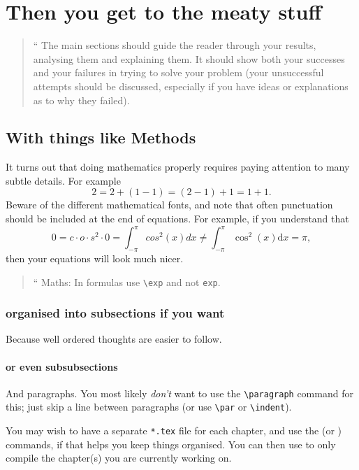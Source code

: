 \documentclass[11pt,a4,twosided,singlespacing,titlepagenumber=on]{scrreprt}
\numberwithin{equation}{chapter} %
\theoremstyle{remark}
\newenvironment{myquote}%
{\begin{quote}{\Large{}``}}%
{\ifhmode\unskip\fi{\Large{}''}\end{quote}}
\begin{document}
\chapter{Then you get to the meaty stuff}
\begin{myquote}
The main sections should guide the reader through your results, analysing them and explaining them.
It should show both your successes and your failures in trying to solve your problem (your unsuccessful
attempts should be discussed, especially if you have ideas or explanations as to why they failed).
\end{myquote}
\section{With things like Methods}
It turns out that doing mathematics properly requires paying attention to many subtle details. For example
\begin{equation}
2=2+(1-1)=(2-1)+1=1+1.
\label{eq:obvious}
\end{equation}
Beware of the different mathematical fonts, and note that often punctuation should be included at the end of equations. For example, if you understand that 
\begin{equation*}
0=c\cdot o \cdot s^2 \cdot 0=\int_{-\pi}^\pi cos^2(x) dx \neq \int_{-\pi}^\pi \cos^2(x) \mathrm{d}x=\pi,
\end{equation*}
then your equations will look much nicer.
\begin{myquote}
Maths: In formulas use \verb|\exp| and not \verb|exp|.
\end{myquote}
\subsection{organised into subsections if you want}
Because well ordered thoughts are easier to follow.
\subsubsection{or even subsubsections}
And paragraphs. You most likely \emph{don't} want to use the \verb|\paragraph| command for this; just skip a line between paragraphs (or use \verb|\par| or \verb|\indent|).

You may wish to have a separate \verb|*.tex| file for each chapter, and use the \verb|| (or \verb||) commands, if that helps you keep things organised. You can then use \verb|| to only compile the chapter(s) you are currently working on.
\end{document}
